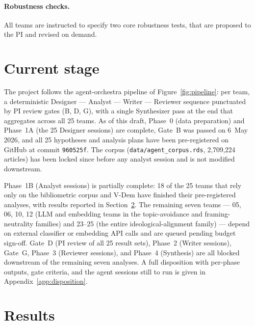 \documentclass[12pt,a4paper]{article}
\begin{document}
\paragraph{Robustness checks.} All teams are instructed to specify two core robustness tests, that are proposed to the PI and revised on demand. 

\section{Current stage}
\label{sec:current-stage}

The project follows the agent-orchestra pipeline of
Figure~\ref{fig:pipeline}: per team, a deterministic Designer ---
Analyst --- Writer --- Reviewer sequence punctuated by PI review gates
(B, D, G), with a single Synthesizer pass at the end that aggregates
across all 25 teams. As of this draft, Phase~0 (data preparation) and
Phase~1A (the 25 Designer sessions) are complete, Gate~B was passed on
6~May 2026, and all 25 hypotheses and analysis plans have been
pre-registered on GitHub at commit \texttt{960525f}. The corpus
(\texttt{data/agent\_corpus.rds}, 2{,}709{,}224 articles) has been
locked since before any analyst session and is not modified downstream.

Phase~1B (Analyst sessions) is partially complete: 18 of the 25 teams
that rely only on the bibliometric corpus and V-Dem have finished their
pre-registered analyses, with results reported in
Section~\ref{sec:results}. The remaining seven teams --- 05, 06, 10,
12 (LLM and embedding teams in the topic-avoidance and
framing-neutrality families) and 23--25 (the entire
ideological-alignment family) --- depend on external classifier or
embedding API calls and are queued pending budget sign-off. Gate~D
(PI review of all 25 result sets), Phase~2 (Writer sessions), Gate~G,
Phase~3 (Reviewer sessions), and Phase~4 (Synthesis) are all blocked
downstream of the remaining seven analyses. A full disposition with
per-phase outputs, gate criteria, and the agent sessions still to run
is given in Appendix~\ref{app:disposition}.

\section{Results}
\label{sec:results}
\end{document}

